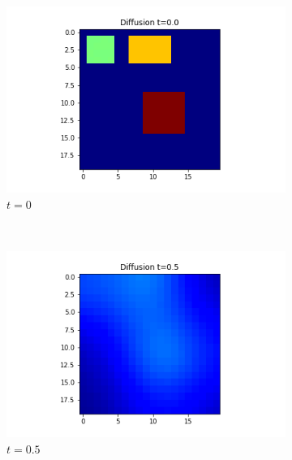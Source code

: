 \documentclass[10pt,a4paper]{article}
\begin{document}
\begin{enumerate}[i)]
\begin{enumerate}[a)]
         		\begin{figure}[!h]
         			\centering
         			\begin{subfigure}[b]{0.25\textwidth}
         				\includegraphics[width=\textwidth]{images/grid-t0-x02.png}
         				\caption{$t=0$}
         				\label{gridt0x02}
         			\end{subfigure}~
         			\begin{subfigure}[b]{0.25\textwidth}
         				\includegraphics[width= \textwidth]{images/grid-t05-x02.png}
         				\caption{$t=0.5$}
         				\label{gridt05x02}
         			\end{subfigure}~
         			\begin{subfigure}[b]{0.25\textwidth}

\end{subfigure}
\end{figure}
\end{enumerate}
\end{enumerate}
\end{document}
